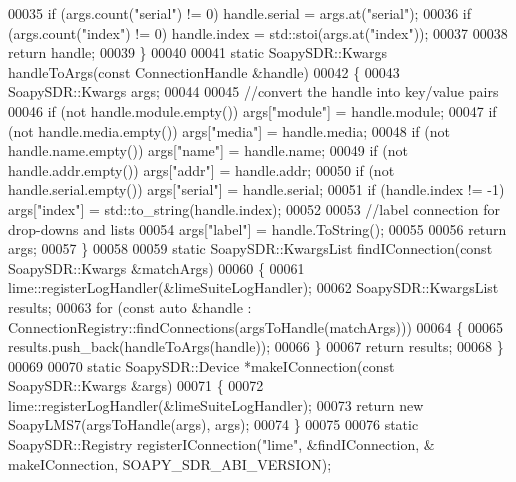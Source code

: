 \begin{DoxyCode}
00035     \textcolor{keywordflow}{if} (args.count(\textcolor{stringliteral}{"serial"}) != 0) handle.serial = args.at(\textcolor{stringliteral}{"serial"});
00036     \textcolor{keywordflow}{if} (args.count(\textcolor{stringliteral}{"index"}) != 0) handle.index = std::stoi(args.at(\textcolor{stringliteral}{"index"}));
00037 
00038     \textcolor{keywordflow}{return} handle;
00039 \}
00040 
00041 \textcolor{keyword}{static} SoapySDR::Kwargs handleToArgs(\textcolor{keyword}{const} ConnectionHandle &handle)
00042 \{
00043     SoapySDR::Kwargs args;
00044 
00045     \textcolor{comment}{//convert the handle into key/value pairs}
00046     \textcolor{keywordflow}{if} (not handle.module.empty()) args[\textcolor{stringliteral}{"module"}] = handle.module;
00047     if (not handle.media.empty()) args[\textcolor{stringliteral}{"media"}] = handle.media;
00048     if (not handle.name.empty()) args[\textcolor{stringliteral}{"name"}] = handle.name;
00049     if (not handle.addr.empty()) args[\textcolor{stringliteral}{"addr"}] = handle.addr;
00050     if (not handle.serial.empty()) args[\textcolor{stringliteral}{"serial"}] = handle.serial;
00051     if (handle.index != -1) args[\textcolor{stringliteral}{"index"}] = std::to\_string(handle.index);
00052 
00053     \textcolor{comment}{//label connection for drop-downs and lists}
00054     args[\textcolor{stringliteral}{"label"}] = handle.ToString();
00055 
00056     \textcolor{keywordflow}{return} args;
00057 \}
00058 
00059 \textcolor{keyword}{static} SoapySDR::KwargsList findIConnection(\textcolor{keyword}{const} SoapySDR::Kwargs &matchArgs)
00060 \{
00061     lime::registerLogHandler(&limeSuiteLogHandler);
00062     SoapySDR::KwargsList results;
00063     \textcolor{keywordflow}{for} (\textcolor{keyword}{const} \textcolor{keyword}{auto} &handle : ConnectionRegistry::findConnections(argsToHandle(matchArgs)))
00064     \{
00065         results.push\_back(handleToArgs(handle));
00066     \}
00067     \textcolor{keywordflow}{return} results;
00068 \}
00069 
00070 \textcolor{keyword}{static} SoapySDR::Device *makeIConnection(\textcolor{keyword}{const} SoapySDR::Kwargs &args)
00071 \{
00072     lime::registerLogHandler(&limeSuiteLogHandler);
00073     \textcolor{keywordflow}{return} \textcolor{keyword}{new} SoapyLMS7(argsToHandle(args), args);
00074 \}
00075 
00076 \textcolor{keyword}{static} SoapySDR::Registry registerIConnection(\textcolor{stringliteral}{"lime"}, &findIConnection, &
      makeIConnection, SOAPY_SDR_ABI_VERSION);
\end{DoxyCode}
